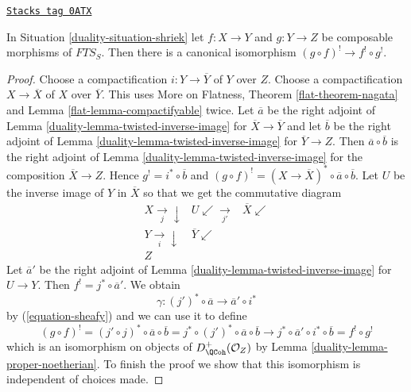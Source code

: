 \begin{lemma}
\label{duality-lemma-upper-shriek-composition}
\href{https://stacks.math.columbia.edu/tag/0ATX}{\texttt{Stacks tag 0ATX}}

In Situation \ref{duality-situation-shriek} let $f : X \to Y$ and $g : Y \to Z$
be composable morphisms of $\textit{FTS}_S$. Then there is a canonical
isomorphism $(g \circ f)^! \to f^! \circ g^!$.
\end{lemma}

\begin{proof}

Choose a compactification $i : Y \to \overline{Y}$ of $Y$ over $Z$.
Choose a compactification $X \to \overline{X}$ of $X$ over
$\overline{Y}$. This uses More on Flatness, Theorem \ref{flat-theorem-nagata}
and Lemma \ref{flat-lemma-compactifyable} twice.
Let $\overline{a}$ be the
right adjoint of Lemma \ref{duality-lemma-twisted-inverse-image} for
$\overline{X} \to \overline{Y}$ and let $\overline{b}$
be the
right adjoint of Lemma \ref{duality-lemma-twisted-inverse-image} for
$\overline{Y} \to Z$.
Then $\overline{a} \circ \overline{b}$ is the
right adjoint of Lemma \ref{duality-lemma-twisted-inverse-image} for
the composition $\overline{X} \to Z$.
Hence $g^! = i^* \circ \overline{b}$ and
$(g \circ f)^! = (X \to \overline{X})^* \circ \overline{a} \circ \overline{b}$.
Let $U$ be the inverse image of $Y$ in $\overline{X}$
so that we get the commutative diagram
$$
\begin{array}{ccc}X \underset{j}{\longrightarrow}\downarrow & U \swarrow\underset{j'}{\longrightarrow} & \overline{X} \swarrow \\ Y \underset{i}{\longrightarrow}\downarrow & \overline{Y} \swarrow &  \\ Z &  & \end{array}
$$
Let $\overline{a}'$ be the
right adjoint of Lemma \ref{duality-lemma-twisted-inverse-image} for
$U \to Y$.
Then $f^! = j^* \circ \overline{a}'$. We obtain
$$
\gamma : (j')^* \circ \overline{a} \to \overline{a}' \circ i^*
$$
by (\ref{equation-sheafy}) and we can use it to define
$$
(g \circ f)^! =
(j' \circ j)^* \circ \overline{a} \circ \overline{b} =
j^* \circ (j')^* \circ \overline{a} \circ \overline{b}
\to
j^* \circ \overline{a}' \circ i^* \circ \overline{b} =
f^! \circ g^!
$$
which is an isomorphism on objects of $D_\QCoh^+(\mathcal{O}_Z)$ by
Lemma \ref{duality-lemma-proper-noetherian}. To finish the proof we show that
this isomorphism is independent of choices made.


\end{proof}
